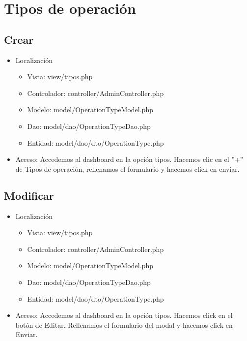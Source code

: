 \section{Tipos de operaci\'{o}n}
\subsection{Crear}
\begin{itemize}
\item Localizaci\'{o}n
\begin{itemize}
\item Vista: view/tipos.php
\item Controlador: controller/AdminController.php
\item Modelo: model/OperationTypeModel.php
\item Dao: model/dao/OperationTypeDao.php
\item Entidad: model/dao/dto/OperationType.php
\end{itemize}
\item Acceso: Accedemos al dashboard en la opci\'{o}n tipos. Hacemos clic en el ''+'' de Tipos de operaci\'{o}n, rellenamos el formulario y hacemos click en enviar.
\end{itemize}
\subsection{Modificar}
\begin{itemize}
\item Localizaci\'{o}n
\begin{itemize}
\item Vista: view/tipos.php
\item Controlador: controller/AdminController.php
\item Modelo: model/OperationTypeModel.php
\item Dao: model/dao/OperationTypeDao.php
\item Entidad: model/dao/dto/OperationType.php
\end{itemize}
\item Acceso: Accedemos al dashboard en la opci\'{o}n tipos. Hacemos click en el bot\'{o}n de Editar. Rellenamos el formulario del modal y hacemos click en Enviar.  
\end{itemize}
